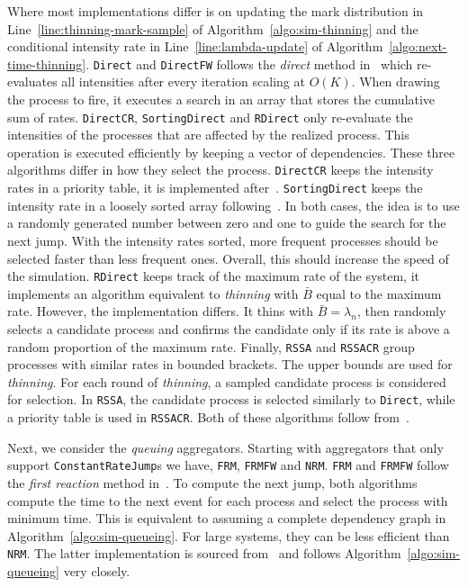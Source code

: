 \documentclass{juliacon}
\begin{document}
Where most implementations differ is on updating the mark distribution in Line~\ref{line:thinning-mark-sample} of Algorithm~\ref{algo:sim-thinning} and the conditional intensity rate in Line~\ref{line:lambda-update} of Algorithm~\ref{algo:next-time-thinning}. \texttt{Direct} and \texttt{DirectFW} follows the \textit{direct} method in~\cite{gillespie1976} which re-evaluates all intensities after every iteration scaling at \( O(K) \). When drawing the process to fire, it executes a search in an array that stores the cumulative sum of rates. \texttt{DirectCR}, \texttt{SortingDirect} and \texttt{RDirect} only re-evaluate the intensities of the processes that are affected by the realized process. This operation is executed efficiently by keeping a vector of dependencies. These three algorithms differ in how they select the process. \texttt{DirectCR} keeps the intensity rates in a priority table, it is implemented after~\cite{slepoy2008}. \texttt{SortingDirect} keeps the intensity rate in a loosely sorted array following~\cite{mccollum2006}. In both cases, the idea is to use a randomly generated number between zero and one to guide the search for the next jump. With the intensity rates sorted, more frequent processes should be selected faster than less frequent ones. Overall, this should increase the speed of the simulation. \texttt{RDirect} keeps track of the maximum rate of the system, it implements an algorithm equivalent to \textit{thinning} with \( \bar{B} \) equal to the maximum rate. However, the implementation differs. It thins with \( \bar{B} = \lambda_n \), then randomly selects a candidate process and confirms the candidate only if its rate is above a random proportion of the maximum rate. Finally, \texttt{RSSA} and \texttt{RSSACR} group processes with similar rates in bounded brackets. The upper bounds are used for \textit{thinning}. For each round of \textit{thinning}, a sampled candidate process is considered for selection. In \texttt{RSSA}, the candidate process is selected similarly to \texttt{Direct}, while a priority table is used in \texttt{RSSACR}. Both of these algorithms follow from~\cite{thanh2014,thanh2017}.

Next, we consider the \textit{queuing} aggregators. Starting with aggregators that only support \texttt{ConstantRateJump}s we have, \texttt{FRM}, \texttt{FRMFW} and \texttt{NRM}. \texttt{FRM} and \texttt{FRMFW} follow the \textit{first reaction} method in~\cite{gillespie1976}. To compute the next jump, both algorithms compute the time to the next event for each process and select the process with minimum time. This is equivalent to assuming a complete dependency graph in Algorithm~\ref{algo:sim-queueing}. For large systems, they can be less efficient than \texttt{NRM}. The latter implementation is sourced from~\cite{gibson2000} and follows Algorithm~\ref{algo:sim-queueing} very closely.
\end{document}
